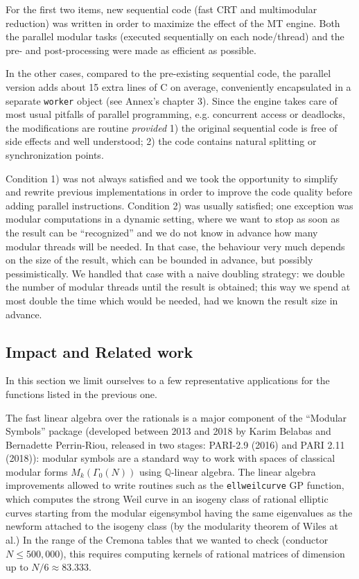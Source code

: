 \documentclass{deliverablereport}
\begin{document}
For the first two items, new sequential code (fast CRT and multimodular
reduction) was written in order to maximize the effect of
the MT engine. Both the parallel modular tasks (executed
sequentially on each node/thread) and the pre- and post-processing
were made as efficient as possible.

In the other cases, compared to the pre-existing sequential code, the
parallel version adds about 15 extra lines of C on average, conveniently
encapsulated in a separate \texttt{worker} object (see Annex's chapter 3).
Since the engine takes care of most usual pitfalls of parallel programming,
e.g. concurrent access or deadlocks, the modifications are routine
\emph{provided} 1) the original sequential code is free of side effects and
well understood; 2) the code contains natural splitting or synchronization
points.

Condition 1) was not always satisfied and we took the opportunity to simplify
and rewrite previous implementations in order to improve the code quality
before adding parallel instructions. Condition 2) was usually satisfied; one
exception was modular computations in a dynamic setting, where we want to
stop as soon as the result can be ``recognized'' and we do not know in
advance how many modular threads will be needed. In that case, the behaviour
very much depends on the size of the result, which can be bounded in advance,
but possibly pessimistically. We handled that case with a naive doubling
strategy: we double the number of modular threads until the result is
obtained; this way we spend at most double the time which would be needed,
had we known the result size in advance.

\subsection{Impact and Related work}

In this section we limit ourselves to a few representative applications
for the functions listed in the previous one.

The fast linear algebra over the rationals is a major component
of the ``Modular Symbols'' package (developed between 2013 and 2018
by Karim Belabas and Bernadette Perrin-Riou, released in two stages: PARI-2.9
(2016) and PARI 2.11 (2018)): modular symbols are a standard way to work with
spaces of classical modular forms $M_k(\Gamma_0(N))$ using
$\mathbb{Q}$-linear algebra. The linear algebra improvements allowed to write
routines such as the \texttt{ellweilcurve} GP function, which computes the
strong Weil curve in an isogeny class of rational elliptic curves starting
from the modular eigensymbol having the same eigenvalues as the newform
attached to the isogeny class (by the modularity theorem of Wiles at al.) In
the range of the Cremona tables that we wanted to check (conductor $N \leq
500,000$), this requires computing kernels of rational matrices of dimension
up to $N / 6\approx 83.333$.
\end{document}
